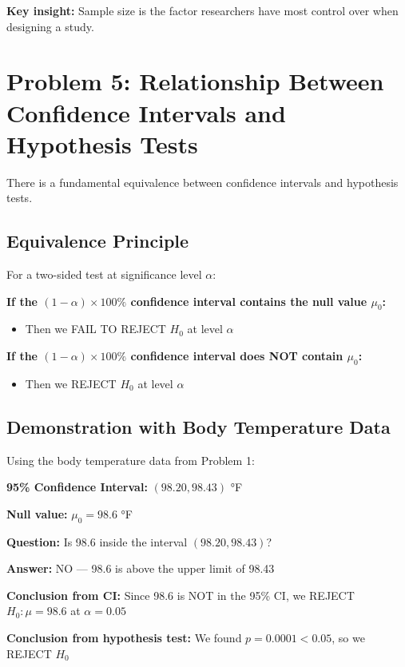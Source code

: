 \documentclass[11pt]{article}
\begin{document}
\textbf{Key insight:} Sample size is the factor researchers have most control over when designing a study.

\vspace{12pt}

\section*{Problem 5: Relationship Between Confidence Intervals and Hypothesis Tests}

There is a fundamental equivalence between confidence intervals and hypothesis tests.

\subsection*{Equivalence Principle}

For a two-sided test at significance level $\alpha$:

\textbf{If the $(1-\alpha) \times 100\%$ confidence interval contains the null value $\mu_0$:}
\begin{itemize}
\item Then we FAIL TO REJECT $H_0$ at level $\alpha$
\end{itemize}

\textbf{If the $(1-\alpha) \times 100\%$ confidence interval does NOT contain $\mu_0$:}
\begin{itemize}
\item Then we REJECT $H_0$ at level $\alpha$
\end{itemize}

\subsection*{Demonstration with Body Temperature Data}

Using the body temperature data from Problem 1:

\textbf{95\% Confidence Interval:} $(98.20, 98.43)$ °F

\textbf{Null value:} $\mu_0 = 98.6$ °F

\textbf{Question:} Is 98.6 inside the interval $(98.20, 98.43)$?

\textbf{Answer:} NO --- 98.6 is above the upper limit of 98.43

\textbf{Conclusion from CI:} Since 98.6 is NOT in the 95\% CI, we REJECT $H_0: \mu = 98.6$ at $\alpha = 0.05$

\textbf{Conclusion from hypothesis test:} We found $p = 0.0001 < 0.05$, so we REJECT $H_0$
\end{document}
